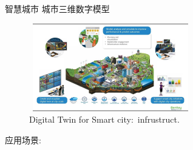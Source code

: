 \begin{frame}{智慧城市}
	城市三维数字模型
\begin{figure}[h!]
\centering
     \includegraphics[height=1.5in, width=2.8in, viewport=0 0 1280 720,clip]{Figures/Digital-Twin_Smart-city-infrustruct.jpg}
\caption{\tiny \textrm{Digital Twin for Smart city:~infrustruct.}}%
\label{Fig:Digital-Twin_Smart-city-infrustruct}
\end{figure}
应用场景:
\vskip -10pt
  \begin{columns}
\fontsize{8.2pt}{6.2pt}\selectfont{
      \begin{itemize}
        \item 交通流量仿真
        \item 应急演练
\end{itemize}}

\fontsize{8.2pt}{6.2pt}\selectfont{
   \begin{itemize}
        \item 能源管理
\end{itemize}}
  \end{columns}
\end{frame}

